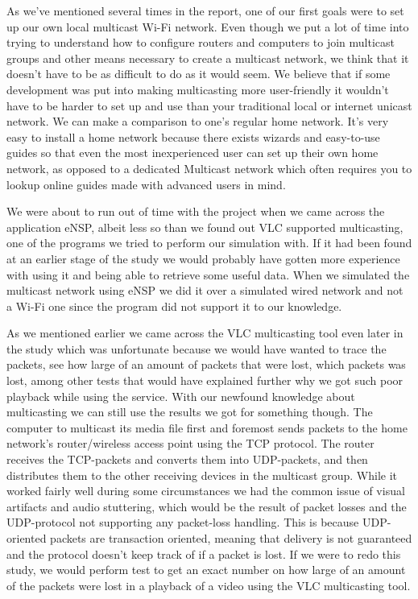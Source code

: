 \documentclass[9pt,a4paper]{acmproc}
\begin{document}
As we've mentioned several times in the report, one of our first goals were to set up our own local multicast Wi-Fi network. Even though we put a lot of time into trying to understand how to configure routers and computers to join multicast groups and other means necessary to create a multicast network, we think that it doesn't have to be as difficult to do as it would seem. We believe that if some development was put into making multicasting more user-friendly it wouldn't have to be harder to set up and use than your traditional local or internet unicast network. We can make a comparison to one's regular home network. It's very easy to install a home network because there exists wizards and easy-to-use guides so that even the most inexperienced user can set up their own home network, as opposed to a dedicated Multicast network which often requires you to lookup online guides made with advanced users in mind. 

We were about to run out of time with the project when we came across the application eNSP, albeit less so than we found out VLC supported multicasting, one of the programs we tried to perform our simulation with. If it had been found at an earlier stage of the study we would probably have gotten more experience with using it and being able to retrieve some useful data. When we simulated the multicast network using eNSP we did it over a simulated wired network and not a Wi-Fi one since the program did not support it to our knowledge. 

As we mentioned earlier we came across the VLC multicasting tool even later in the study which was unfortunate because we would have wanted to trace the packets, see how large of an amount of packets that were lost, which packets was lost, among other tests that would have explained further why we got such poor playback while using the service. With our newfound knowledge about multicasting we can still use the results we got for something though. The computer to multicast its media file first and foremost sends packets to the home network's router/wireless access point using the TCP protocol. The router receives the TCP-packets and converts them into UDP-packets, and then distributes them to the other receiving devices in the multicast group. While it worked fairly well during some circumstances we had the common issue of visual artifacts and audio stuttering, which would be the result of packet losses and the UDP-protocol not supporting any packet-loss handling. This is because UDP-oriented packets are transaction oriented, meaning that delivery is not guaranteed and the protocol doesn't keep track of if a packet is lost. If we were to redo this study, we would perform test to get an exact number on how large of an amount of the packets were lost in a playback of a video using the VLC multicasting tool. \cite{udpSource}
\end{document}
